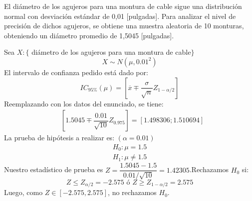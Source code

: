 
\question[15] El di\'ametro de los agujeros para una montura de cable sigue una distribuci\'on normal con desviaci\'on est\'andar de 0,01 [pulgadas]. Para analizar el nivel de precisi\'on de dichos agujeros, se obtiene una muestra aleatoria de 10 monturas, obteniendo un di\'ametro promedio de 1,5045 [pulgadas].\noaddpoints{}

\begin{solution}
Sea $X:\{$ di\'ametro de los agujeros para una montura de cable$\}$$$X\sim N(\mu,0.01^2) $$El intervalo de confianza pedido est\'a dado por:$$IC_{95\%}(\mu)=\left[ \overline{x} \mp \dfrac{\sigma}{\sqrt{n}} Z_{1-\alpha/2} \right]$$Reemplazando con los datos del enunciado, se tiene:\begin{align*}&\left[ 1.5045 \mp \dfrac{0.01}{\sqrt{10}}Z_{0.975}\right]=  \left[ 1.498306 ; 1.510694\right] \end{align*}La prueba de hip\'otesis a realizar es: $(\alpha=0.01)$\begin{align*}H_0: \mu=1.5 \\H_1: \mu \neq 1.5\end{align*}Nuestro estad\'istico de prueba es $Z=\dfrac{1.5045-1.5}{0.01/\sqrt{10}}=1.42305$.Rechazamos $H_0$ si:$$ Z \leq Z_{\alpha/2}=-2.575 \text{ \'o } Z \geq Z_{1-\alpha/2}=2.575 $$Luego, como $Z\in [-2.575,2.575]$, no rechazamos $H_0$.
\end{solution}